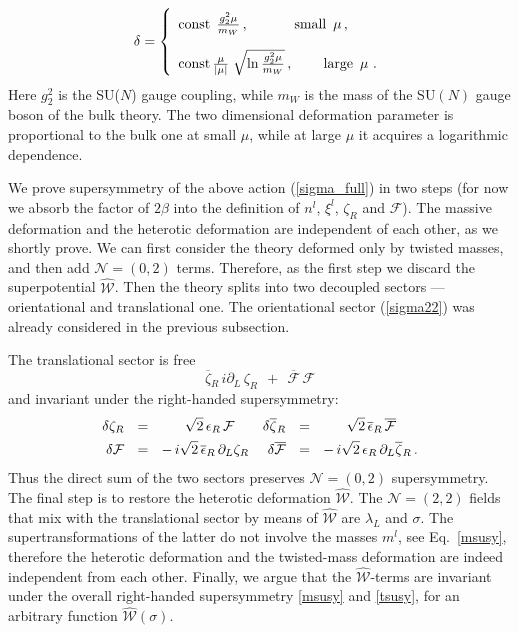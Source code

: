 \documentclass[12pt]{article}
\def\beq{\begin{equation}}
\def\eeq{\end{equation}}
\newcommand{\ntwot}{${\mathcal N}= \left(2,2\right) $ }
\newcommand{\ntwoo}{${\mathcal N}= \left(0,2\right) $ }
\newcommand{\p}{\partial}
\newcommand{\ov}{\overline}
\newcommand{\mc}[1]{\mathcal{#1}}
\newcommand{\bzr}{\ov{\zeta}{}_R}
\newcommand{\zr}{\zeta_R}
\newcommand{\blal}{\ov{\lambda}{}_L}
\newcommand{\ff}{\mc{F}}
\newcommand{\bff}{\ov{\mc{F}}}
\newcommand{\eer}{\epsilon_R}
\newcommand{\beer}{\ov{\epsilon}{}_R}
\begin{document}
\beq
\delta =
\left\{
\begin{array}{l}\rule{0mm}{5mm}
 {\rm const}\;\,\frac{g_2^2\mu}{m_W}\, , \quad\qquad\;  \mbox{small}\,\,\,
 \mu\,,\\[4mm]
 {\rm const}\,\frac{\mu}{|\mu|}\;
 \sqrt{\ln{\frac{g^2_2\mu}{m_W}}} \, , \qquad\, \mbox{large}\,\,\,\mu\,\, .
 \end{array}
 \right.
\label{deltamu}
\eeq
Here $g_2^2$ is the SU($N$) gauge coupling, 
while $m_W$ is the mass of the SU$(N)$ gauge boson of the bulk theory. The two dimensional deformation parameter is proportional to
the bulk one at small $\mu$, while at large $\mu$ it
acquires a logarithmic dependence.



        We prove supersymmetry of the above action 
        (\ref{sigma_full}) in two steps
	(for now we absorb the factor of $ 2\beta $ into the definition of $ n^l $, $ \xi^l $,
        $ \zeta_R $ and $ \mc{F} $).
        The massive deformation and the heterotic deformation are independent of each other, as we shortly prove.
	We can first consider the theory deformed only by twisted masses, and then add \ntwoo terms.
        Therefore, as the first step we discard the superpotential $ \hat{\mc{W}} $.
        Then the theory splits into two decoupled sectors --- orientational and translational one. 
        The orientational sector (\ref{sigma22}) was 
        already considered in the previous subsection.
   
	


	The translational sector is free
\[
	\bzr\, i\p_L\, \zr ~~+~~ \bff\,\ff
\]
	and invariant under the right-handed supersymmetry:
\begin{align}
%
\notag
        \delta \zr & ~~=~~ ~~~~~ \sqrt{2}\, \eer\, \ff
        &
        \delta \bzr & ~~=~~ ~~~~~ \sqrt{2}\, \beer\, \bff
        \\
%
\label{tsusy}
        \delta \ff & ~~=~~ -\, i\sqrt{2}\, \beer\, \p_L \zr
        &
        \delta \bff & ~~=~~ -\, i\sqrt{2}\, \eer\, \p_L \bzr
        \,.
\end{align}
	Thus the direct sum of the two sectors preserves \ntwoo supersymmetry.
	The final step is to restore the heterotic deformation $ \hat{\mc{W}} $. 
	The \ntwot fields that mix with the translational sector by means
	of $ \hat{\mc{W}} $ are $ \lambda_L $ and $ \sigma $.
	The supertransformations of the latter do not involve the masses $ m^l $, see Eq.~\eqref{msusy},
	therefore the heterotic deformation and the twisted-mass deformation are indeed independent
	from each other.
	Finally, we argue that the $ \hat{\mc{W}} $-terms are invariant under the overall
	right-handed supersymmetry \eqref{msusy} and \eqref{tsusy}, for an arbitrary function $ \hat{\mc{W}}(\sigma) $.
\end{document}
